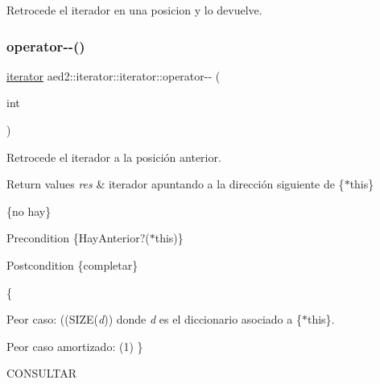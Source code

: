 Retrocede el iterador en una posicion y lo devuelve. \mbox{\label{classaed2_1_1iterator_1_1iterator_a6bd61026c75767d0d41e45229144e9d0}} 
\subsubsection{\texorpdfstring{operator-\/-\/()}{operator--()}\hspace{0.1cm}{\footnotesize\ttfamily [2/2]}}
{\footnotesize\ttfamily \hyperlink{classaed2_1_1iterator_1_1iterator}{iterator} aed2\+::iterator\+::iterator\+::operator-\/-\/ (\begin{DoxyParamCaption}\item[{int}]{ }\end{DoxyParamCaption})\hspace{0.3cm}{\ttfamily [inline]}}



Retrocede el iterador a la posición anterior. 


\begin{DoxyRetVals}{Return values}
{\em res} & iterador apuntando a la dirección siguiente de \{$\ast$this\}\\
\hline
\end{DoxyRetVals}
\{no hay\}

\begin{DoxyPrecond}{Precondition}
\{Hay\+Anterior?($\ast$this)\} 
\end{DoxyPrecond}
\begin{DoxyPostcond}{Postcondition}
\{completar\}
\end{DoxyPostcond}
\{
\begin{DoxyItemize}
\item Peor caso\+: ((S\+I\+ZE({\itshape d})) donde {\itshape d} es el diccionario asociado a \{$\ast$this\}.
\item Peor caso amortizado\+: (1) \}
\end{DoxyItemize}

C\+O\+N\+S\+U\+L\+T\+AR \mbox{\label{classaed2_1_1iterator_1_1iterator_a9e9f5ca8d13a6945d6520736c0cc1a4f}} 
